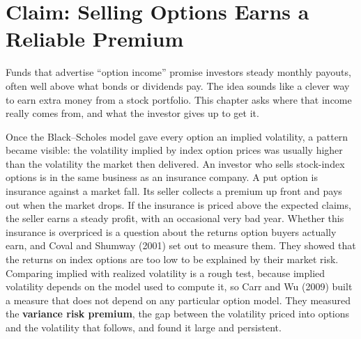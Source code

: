 \makeatletter
{}
\makeatother

\makeatletter
\makeatother

\chapter{Claim: Selling Options Earns a Reliable Premium}
\label{ch:16}

Funds that advertise ``option income'' promise investors steady monthly payouts, often well above what bonds or dividends pay. The idea sounds like a clever way to earn extra money from a stock portfolio. This chapter asks where that income really comes from, and what the investor gives up to get it.

Once the Black--Scholes model gave every option an implied volatility, a pattern became visible: the volatility implied by index option prices was usually higher than the volatility the market then delivered. An investor who sells stock-index options is in the same business as an insurance company. A put option is insurance against a market fall. Its seller collects a premium up front and pays out when the market drops. If the insurance is priced above the expected claims, the seller earns a steady profit, with an occasional very bad year. Whether this insurance is overpriced is a question about the returns option buyers actually earn, and Coval and Shumway (2001) set out to measure them. They showed that the returns on index options are too low to be explained by their market risk. Comparing implied with realized volatility is a rough test, because implied volatility depends on the model used to compute it, so Carr and Wu (2009) built a measure that does not depend on any particular option model. They measured the \textbf{variance risk premium}, the gap between the volatility priced into options and the volatility that follows, and found it large and persistent.

